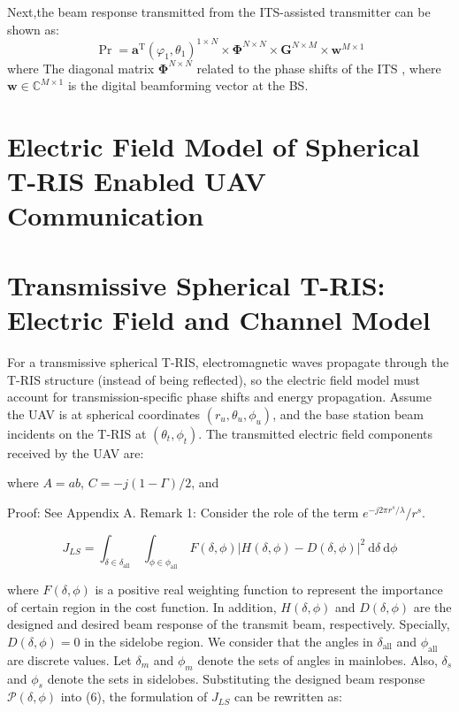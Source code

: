 \documentclass[journal,comsoc]{IEEEtran}
\begin{document}
	Next,the beam response transmitted from the ITS-assisted
	transmitter can be shown as:
	\begin{equation}
		\Pr = \boldsymbol{a}^\text{T}(\varphi_1, \theta_1)^{\!\!1 \times N} \times \boldsymbol{\Phi}^{N \times N} \times \boldsymbol{G}^{N \times M} \times \boldsymbol{w}^{M \times 1} 
	\end{equation}
	where The diagonal matrix  $\boldsymbol{\Phi}^{N \times N}$  
	related to the phase shifts of the ITS ,
	where $\boldsymbol{w} \in \mathbb{C}^{M \times 1}$ is the digital beamforming vector at the BS.
	
	\section{Electric Field Model of Spherical T-RIS Enabled UAV Communication}
	
	
	\section{Transmissive Spherical T-RIS: Electric Field and Channel Model}
	
	For a transmissive spherical T-RIS, electromagnetic waves propagate through the T-RIS structure (instead of being reflected), so the electric field model must account for transmission-specific phase shifts and energy propagation. Assume the UAV is at spherical coordinates $(r_u, \theta_u, \phi_u)$, and the base station beam incidents on the T-RIS at $(\theta_t, \phi_t)$. The transmitted electric field components received by the UAV are:
	
	where $A = ab$, $C = -j(1 - \Gamma)/2$, and
	
	Proof: See Appendix A.
	Remark 1: Consider the role of the term $e^{-j 2\pi r^s / \lambda}/r^s$.
	
	
	$$
	J_{L S}=\int_{\delta \in \delta_{\text {all }}} \int_{\phi \in \phi_{\text {all }}} F(\delta, \phi)|H(\delta, \phi)-D(\delta, \phi)|^2 \mathrm{~d} \delta \mathrm{~d} \phi
	$$
	
	
	where $ F(\delta, \phi) $ is a positive real weighting function to represent the importance of certain region in the cost function. In addition, $ H(\delta, \phi) $ and $ D(\delta, \phi) $ are the designed and desired beam response of the transmit beam, respectively. Specially, $ D(\delta, \phi) = 0 $ in the sidelobe region. We consider that the angles in $ \delta_{\text{all}} $ and $ \phi_{\text{all}} $ are discrete values. Let $ \delta_m $ and $ \phi_m $ denote the sets of angles in mainlobes. Also, $ \delta_s $ and $ \phi_s $ denote the sets in sidelobes. Substituting the designed beam response $ \mathcal{P}(\delta, \phi) $ into (6), the formulation of $ J_{LS} $ can be rewritten as:
	
\end{document}
